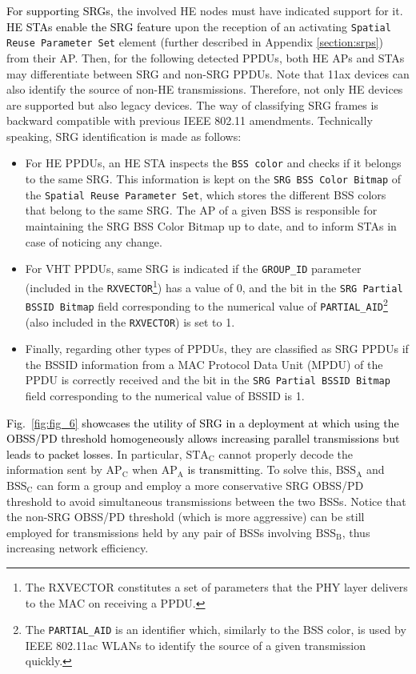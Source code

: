 \documentclass[preprint,12pt]{elsarticle}
\begin{document}
\textcolor{black}{For supporting SRGs,} the involved HE nodes must have indicated support for it. \textcolor{black}{HE STAs enable the SRG feature} upon the reception of an activating \texttt{Spatial Reuse Parameter Set} element (further described in Appendix \ref{section:srps}) from their AP. Then, for the following detected PPDUs, both HE APs and STAs may differentiate between SRG and non-SRG PPDUs. Note that 11ax devices can also identify the source of non-HE transmissions. Therefore, not only HE devices are supported but also legacy devices. The way of classifying SRG frames is backward compatible with previous IEEE 802.11 amendments. Technically speaking, SRG identification is made as follows:
\begin{itemize}
	\item For HE PPDUs, an HE STA inspects the \texttt{BSS color} and checks if it belongs to the same SRG. This information is kept on the \texttt{SRG BSS Color Bitmap} of the \texttt{Spatial Reuse Parameter Set}, which stores the different BSS colors that belong to the same SRG. The AP of a given BSS is responsible for maintaining the SRG BSS Color Bitmap up to date, and to inform STAs in case of noticing any change.
	\item For VHT PPDUs, same SRG is indicated if the \texttt{GROUP\_ID} parameter (included in the \texttt{RXVECTOR}\footnote{The RXVECTOR constitutes a set of parameters that the PHY layer delivers to the MAC on receiving a PPDU.}) has a value of 0, and the bit in the \texttt{SRG Partial BSSID Bitmap} field corresponding to the numerical value of \texttt{PARTIAL\_AID}\footnote{The \texttt{PARTIAL\_AID} is an identifier which, similarly to the BSS color, is used by IEEE 802.11ac WLANs to identify the source of a given transmission quickly.} (also included in the \texttt{RXVECTOR}) is set to 1. 
	\item Finally, regarding other types of PPDUs, they are classified as SRG PPDUs if the BSSID information from a MAC Protocol Data Unit (MPDU) of the PPDU is correctly received and the bit in the \texttt{SRG Partial BSSID Bitmap} field corresponding to the numerical value of BSSID is 1.
\end{itemize}

\textcolor{black}{Fig.~\ref{fig:fig_6} showcases the utility of SRG in a deployment at which using the OBSS/PD threshold homogeneously allows increasing parallel transmissions but leads to packet losses.} In particular, $\text{STA}_\text{C}$ cannot properly decode the information sent by $\text{AP}_\text{C}$ when $\text{AP}_\text{A}$ \textcolor{black}{is transmitting}. To solve this, $\text{BSS}_\text{A}$ and $\text{BSS}_\text{C}$ can form a group and employ a more conservative SRG OBSS/PD threshold to avoid simultaneous transmissions between the two BSSs. Notice that the non-SRG OBSS/PD threshold (which is more aggressive) can be still employed for transmissions held by any pair of BSSs involving $\text{BSS}_\text{B}$, thus increasing network efficiency. %
\end{document}
